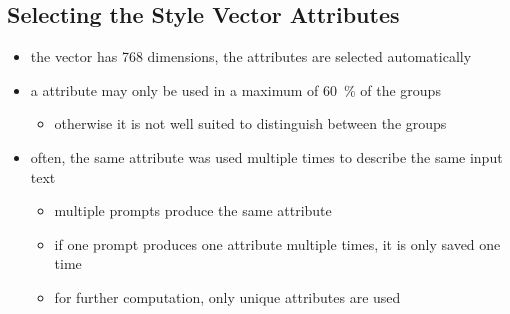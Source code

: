 \subsection{Selecting the Style Vector Attributes}

\begin{itemize}
  \item the vector has 768 dimensions, the attributes are selected automatically
  \item a attribute may only be used in a maximum of \SI{60}{\percent} of the groups
        \begin{itemize}
          \item otherwise it is not well suited to distinguish between the groups
        \end{itemize}
  \item often, the same attribute was used multiple times to describe the same input text
        \begin{itemize}
          \item multiple prompts produce the same attribute
          \item if one prompt produces one attribute multiple times, it is only saved one time
          \item for further computation, only unique attributes are used
        \end{itemize}
\end{itemize}